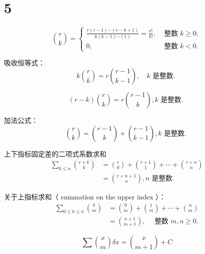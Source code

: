 \setcounter{chapter}{4}
\chapter{5}

\setcounter{equation}{0}
\begin{equation}
    {r \choose k}= \begin{cases}\frac{r(r-1) \cdots(r-k+1)}{k(k-1) \cdots(1)}=\frac{r^{\underline{k}}}{k !}, & \text { 整数 } k \geqslant 0 ; \\
             0,                                                                           & \text { 整数 } k<0 .\end{cases}
\end{equation}

吸收恒等式：
\setcounter{equation}{5}
\begin{equation}
    k{r \choose k}=r{r-1 \choose k-1}, \quad k \text{ 是整数. }
\end{equation}

\begin{equation}
    (r-k){r \choose k}=r{r-1 \choose k}, k \text { 是整数. }
\end{equation}

加法公式：
\begin{equation}
    {r \choose k}={r-1 \choose k}+{r-1 \choose k-1}, k \text { 是整数. }
\end{equation}

上下指标固定差的二项式系数求和
\begin{equation}
    \begin{aligned}
    \sum_{k \leqslant n}{r+k \choose k} &={r \choose 0}+{r+1 \choose 1}+\cdots+{r+n \choose n} \\
    &={r+n+1 \choose n}, n \text { 是整数. }
    \end{aligned}
\end{equation}
    
关于上指标求和（ summation on the upper index ）：
\begin{equation}
    \begin{aligned}
    \sum_{0 \leqslant k \leqslant n}{k \choose m} &={0 \choose m}+{1 \choose m}+\cdots+{n \choose m} \\
    &={n+1 \choose m+1}, \quad \text { 整数 } m, n \geqslant 0 .
    \end{aligned}
\end{equation}

\begin{equation}
    \sum{x \choose m} \delta x={x \choose m+1}+C
\end{equation}

